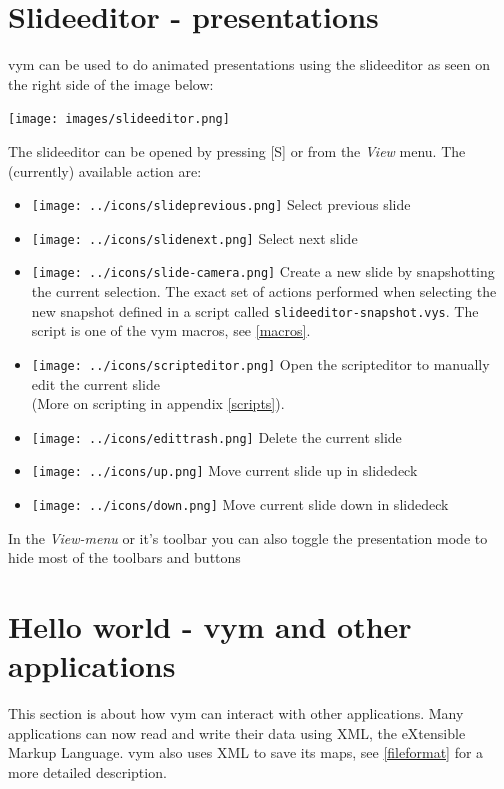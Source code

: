 \documentclass[12pt,a4paper]{article}
\newcommand{\vym}{{\sc vym }}
\newcommand{\key}[1]{[#1]}
\begin{document}
\section{Slideeditor - presentations}\label{slideeditor}
\vym can be used to do animated presentations using the slideeditor as
seen on the right side of the image below:
\begin{center}
    \texttt{[image: images/slideeditor.png]}
\end{center}
The slideeditor can be opened by pressing \key{S} or from the {\em View}
menu. The (currently) available action are:
\begin{itemize}
    \item
    \texttt{[image: ../icons/slideprevious.png]}
    Select previous slide

    \item
    \texttt{[image: ../icons/slidenext.png]}
    Select next slide

    \item
    \texttt{[image: ../icons/slide-camera.png]}
    Create a new slide by snapshotting the current selection. The exact
    set of actions performed when selecting the new snapshot defined in
    a script called {\tt slideeditor-snapshot.vys}. The script is one of
    the \vym macros, see \ref{macros}.

    \item
    \texttt{[image: ../icons/scripteditor.png]}
    Open the scripteditor to manually edit the current slide \\
    (More on scripting in appendix \ref{scripts}).
    
    \item
    \texttt{[image: ../icons/edittrash.png]}
    Delete the current slide
    
    \item
    \texttt{[image: ../icons/up.png]}
    Move current slide up in slidedeck
    
    \item
    \texttt{[image: ../icons/down.png]}
    Move current slide down in slidedeck
\end{itemize}
In the {\em View-menu} or it's toolbar you can also toggle the
presentation mode to hide most of the toolbars and buttons


\section{Hello world - vym and other applications}
This section is about how \vym can interact with other applications.
Many applications can now read and write their data using XML, the
eXtensible Markup Language. \vym also uses XML to save its maps, see
\ref{fileformat} for a more detailed description. 
\end{document}
